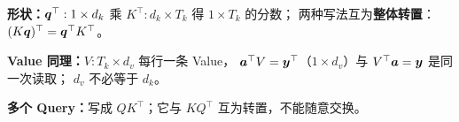 \begin{tcolorbox}[
  enhanced,breakable=false,colback=paper,colframe=linegray,
  boxrule=.7pt,arc=2mm,left=3mm,right=3mm,top=3mm,bottom=3mm,
]
\par\smallskip
\noindent\textbf{形状：}$\boldsymbol{q}^\top:1\times d_k$ 乘 $K^\top:d_k\times T_k$ 得 $1\times T_k$ 的分数；
两种写法互为\textbf{整体转置}：{\color{flowcolor}\bfseries $(K\boldsymbol{q})^\top=\boldsymbol{q}^\top K^\top$}。

\noindent\textbf{Value 同理：}$V:T_k\times d_v$ 每行一条 Value，
$\boldsymbol{a}^\top V=\boldsymbol{y}^\top$（$1\times d_v$）与 $V^\top\boldsymbol{a}=\boldsymbol{y}$ 是同一次读取；
$d_v$ 不必等于 $d_k$。

\noindent\textbf{多个 Query：}写成 $QK^\top$；它与 $KQ^\top$ 互为转置，不能随意交换。
\par %
\end{tcolorbox}

\tagstructend
